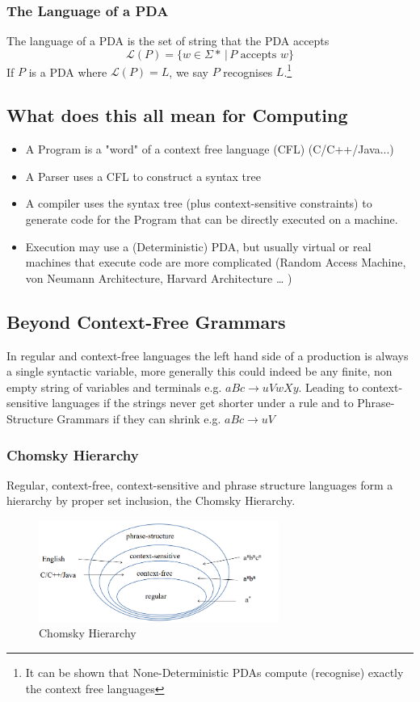 \subsubsection{The Language of a PDA}
The language of a PDA is the set of string that the PDA accepts
$$
    \mathscr{L}(P)= \{w \in \Sigma* \, |\, P \text{ accepts }w\}
$$
If $P$ is a PDA where $\mathscr{L}(P)=L$, we say $P$ recognises $L$.\footnote{It can be shown that None-Deterministic PDAs compute (recognise) exactly the context free languages}
\subsection{What does this all mean for Computing}
\begin{itemize}
    \item A Program is a "word" of a context free language (CFL) (C/C++/Java...)
    \item A Parser uses a CFL to construct a syntax tree
    \item A compiler uses the syntax tree (plus context-sensitive constraints) to generate code for the Program that can be directly executed on a machine.
    \item Execution may use a (Deterministic) PDA, but usually virtual or real machines that execute code are more complicated (Random Access Machine, von Neumann Architecture, Harvard Architecture … )
\end{itemize}
\subsection{Beyond Context-Free Grammars}
In regular and context-free languages the left hand side of a production is always a single syntactic variable, more generally this could indeed be any finite, non empty string of variables and terminals e.g. $aBc \rightarrow uVwXy$. Leading to context-sensitive languages if the strings never get shorter under a rule and to Phrase-Structure Grammars if they can shrink e.g. $aBc \rightarrow uV$
\subsubsection{Chomsky Hierarchy}
Regular, context-free, context-sensitive and phrase structure languages form a hierarchy by proper set inclusion, the Chomsky Hierarchy.
\begin{figure}[h]
    \centering
    \includegraphics[width = 0.7\textwidth]{Images/ChomskyHierarchy.PNG}
    \caption{Chomsky Hierarchy}
    \label{fig:ChomskyHierarchy}
\end{figure}
